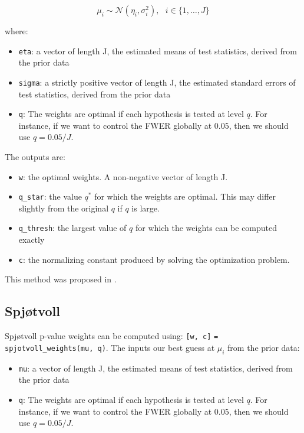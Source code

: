 \documentclass[english,11pt]{article} %
\begin{document}
$$\mu_i \sim \mathcal{N}(\eta_i,\sigma_i^2), \mbox{   } i \in \{1,\ldots, J\}$$ 

where:

\begin{itemize}
\item \verb+eta+:  a vector of length J, the estimated means of test statistics, derived from the prior data
\item \verb+sigma+:  a strictly positive vector of length J, the estimated standard errors of test statistics, derived from the prior data
\item \verb+q+: The weights are optimal if each hypothesis is tested at level $q$. For instance, if we want to control the FWER globally at $0.05$, then we should use $q = 0.05/J$.
\end{itemize}

The outputs are: 
\begin{itemize}
\item \verb+w+:  the optimal weights. A non-negative vector of length J.
\item \verb+q_star+: the value $q^*$ for which the weights are optimal. This may differ slightly from the original $q$ if $q$ is large.
\item \verb+q_thresh+: the largest value of $q$ for which the weights can be computed exactly 
\item \verb+c+:  the normalizing constant produced by solving the optimization problem.
\end{itemize}

This method was proposed in \cite{dobriban2015optimal}.

\subsection{Spj\o tvoll}


Spj\o tvoll p-value weights can be computed using:  \verb+[w, c]+ \verb+= spjotvoll_weights(mu, q)+. The inputs our best guess at $\mu_i$ from the prior data:

\begin{itemize}
\item \verb+mu+:  a vector of length J, the estimated means of test statistics, derived from the prior data
\item \verb+q+: The weights are optimal if each hypothesis is tested at level $q$. For instance, if we want to control the FWER globally at $0.05$, then we should use $q = 0.05/J$.
\end{itemize}
\end{document}
